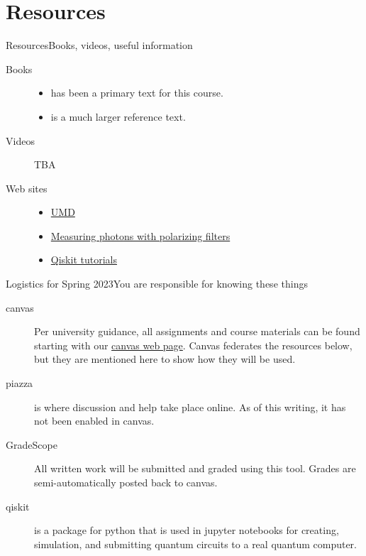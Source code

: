 \section*{Resources}
\begin{frame}{Resources}{Books, videos, useful information}
\begin{description}
    \item[Books]
    \begin{itemize}
        \item \Kaye{} has been a primary text for this course.
        \item \MikeIke{} is a much larger reference text.
    \end{itemize}
    \item[Videos] TBA
    \item[Web sites]
    \begin{itemize}
        \item \href{https://quantumatlas.umd.edu/}{UMD}
        \item \href{https://quantumatlas.umd.edu/gallery/MeasuringPolarization}{Measuring photons with polarizing filters}
        \item \href{https://github.com/Qiskit/qiskit-tutorials/tree/master/tutorials}{Qiskit tutorials}
    \end{itemize}
    
\end{description}
\end{frame}

\begin{frame}{Logistics for Spring 2023}{You are responsible for knowing these things}

\begin{description}
    \item[canvas]  Per university guidance, all assignments and course materials can be found starting with our \href{https://wustl.instructure.com/courses/101458}{canvas web page}.  Canvas federates the resources below, but they are mentioned here to show how they will be used.
    \item[piazza] is where discussion and help take place online.  As of this writing, it has not been enabled in canvas.
    \item[GradeScope] All written work will be submitted and graded using this tool.  Grades are semi-automatically posted back to canvas.
    \item[qiskit] is a package for python that is used in jupyter notebooks for creating, simulation, and submitting quantum circuits to a real quantum computer.
\end{description}
\end{frame}


